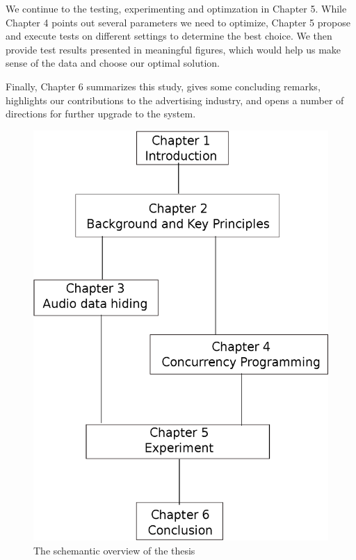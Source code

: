 We continue to the testing, experimenting and optimzation in Chapter 5. While Chapter 4 points out several parameters we need to optimize, Chapter 5 propose and execute tests on different settings to determine the best choice. We then provide test results presented in meaningful figures, which would help us make sense of the data and choose our optimal solution. 

Finally, Chapter 6 summarizes this study, gives some concluding remarks, highlights our contributions to the advertising industry, and opens a number of directions for further upgrade to the system.

\begin{figure}
  \includegraphics{drawing-2.eps}
  \caption{The schemantic overview of the thesis}
  \label{fig:ThesisOverview}
\end{figure}